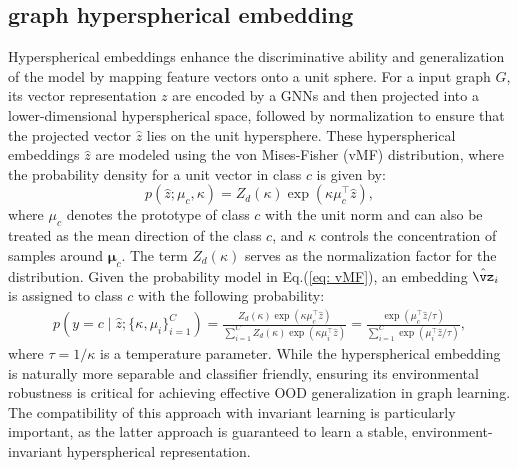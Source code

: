 \subsection{graph hyperspherical embedding}
Hyperspherical embeddings enhance the discriminative ability and generalization of the model by mapping feature vectors onto a unit sphere. For a input graph $G$, its vector representation $z$ are encoded by a GNNs and then projected into a lower-dimensional hyperspherical space, followed by normalization to ensure that the projected vector $\hat{z}$ lies on the unit hypersphere.
These hyperspherical embeddings $\hat{z}$ are modeled using the von Mises-Fisher (vMF) distribution, where the probability density for a unit vector in class $c$ is given by:
\begin{equation}
\label{eq: vMF} p(\hat{z}; \mu_c, \kappa ) = Z_d(\kappa) \exp(\kappa \mu_c^\top \hat{z}), 
\end{equation} 
where ${\mu}_c$ denotes the prototype of class $c$ with the unit norm and can also be treated as the mean direction of the class $c$, and $\kappa$ controls the concentration of samples around $\boldsymbol{\mu}_c$.
The term $Z_d(\kappa)$ serves as the normalization factor for the distribution. Given the probability model in Eq.(\ref{eq: vMF}), an embedding $\hat{\vz}_{i}$ is assigned to class $c$ with the following probability:
\begin{equation} \label{eq: prototpye_1}
    \begin{aligned}
p\left(y = c \mid \hat{z}; \{\kappa, \mu_{i}\}_{i = 1}^{C}\right) = \frac{Z_{d}(\kappa) \exp \left(\kappa \mu_{c}^{\top} \hat{z}\right)}{\sum_{i = 1}^{C} Z_{d}(\kappa) \exp \left(\kappa \mu_{i}^{\top} \hat{z}\right)} = \frac{\exp \left(\mu_{c}^{\top} \hat{z} / \tau\right)}{\sum_{i = 1}^{C} \exp \left(\mu_{i}^{\top} \hat{z} / \tau\right)},
    \end{aligned}
\end{equation}
where $\tau = 1/\kappa$ is a temperature parameter. While the hyperspherical embedding is naturally more separable and classifier friendly, ensuring its environmental robustness is critical for achieving effective OOD generalization in graph learning. The compatibility of this approach with invariant learning is particularly important, as the latter approach is guaranteed to learn a stable, environment-invariant hyperspherical representation. 


